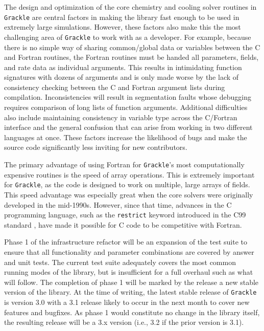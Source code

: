 \documentclass[11pt]{article}
\newcommand{\grackle}{\texttt{Grackle}}
\begin{document}
\begin{flushleft}
The design and optimization of the core chemistry and cooling solver
routines in \grackle{} are central factors in making the library fast
enough to be used in extremely large simulations.  However, these
factors also make this the most challenging area of \grackle{} to
work with as a developer.  For example, because there is no simple way
of sharing common/global data or variables between the C and Fortran
routines, the Fortran routines must be handed all parameters, fields,
and rate data as individual arguments.  This results in intimidating
function signatures with dozens of arguments and is only made worse by
the lack of consistency checking between the C and Fortran argument
lists during compilation.  Inconsistencies will result in segmentation
faults whose debugging requires comparison of long lists of function
arguments.  Additional difficulties also include maintaining
consistency in variable type across the C/Fortran interface and the
general confusion that can arise from working in two different
languages at once.  These factors increase the likelihood of bugs and
make the source code significantly less inviting for new
contributors.

The primary advantage of using Fortran for \grackle{}'s most
computationally expensive routines is the speed of array operations.
This is extremely important for \grackle{}, as the code is designed to
work on multiple, large arrays of fields.  This speed advantage was
especially great when the core solvers were originally developed in
the mid-1990s.  However, since that time, advances in the C
programming language, such as the \texttt{restrict} keyword introduced
in the C99 standard \citep{c99}, have made it possible for C code to
be competitive with Fortran.

Phase 1 of the infrastructure refactor will be an expansion of the
test suite to ensure that all functionality and parameter
combinations are covered by answer and unit tests.  The current
test suite adequately covers the most common running modes of the
library, but is insufficient for a full overhaul such as what will
follow.  The completion of phase 1 will be marked by
the release a new stable version of the library.  At the time of
writing, the latest stable release of \grackle{} is version 3.0 with a
3.1 release likely to occur in the next month to cover new features
and bugfixes.  As phase 1 would constitute no change in the library
itself, the resulting release will be a 3.x version (i.e., 3.2 if the
prior version is 3.1).


\end{flushleft}
\end{document}
